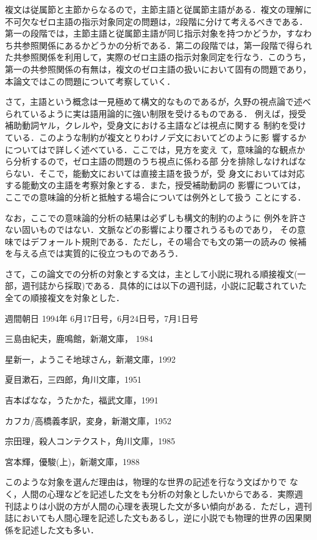 複文は従属節と主節からなるので，主節主語と従属節主語がある．複文の理解に
不可欠なゼロ主語の指示対象同定の問題は，2段階に分けて考えるべきである．
第一の段階では，主節主語と従属節主語が同じ指示対象を持つかどうか，すなわ
ち共参照関係にあるかどうかの分析である．第二の段階では，第一段階で得られ
た共参照関係を利用して，実際のゼロ主語の指示対象同定を行なう．このうち，
第一の共参照関係の有無は，複文のゼロ主語の扱いにおいて固有の問題であり，
本論文ではこの問題について考察していく．

さて，主語という概念は一見極めて構文的なものであるが，久野の視点論\cite
{久野78}で述べられているように実は語用論的に強い制限を受けるものである．
例えば，授受補助動詞ヤル，クレルや，受身文における主語などは視点に関する
制約を受けている．このような制約が複文とりわけノデ文においてどのように影
響するかについては\cite{中川動機95}で詳しく述べている．ここでは，見方を変え
て，意味論的な観点から分析するので，ゼロ主語の問題のうち視点に係わる部
分を排除しなければならない．そこで，能動文においては直接主語を扱うが，受
身文においては対応する能動文の主語を考察対象とする．また，授受補助動詞の
影響については，ここでの意味論的分析と抵触する場合については例外として扱う
ことにする．

なお，ここでの意味論的分析の結果は必ずしも構文的制約のように
例外を許さない固いものではない．文脈などの影響により覆されうるものであり，
その意味ではデフォールト規則である．ただし，その場合でも文の第一の読みの
候補を与える点では実質的に役立つものであろう．

さて，この論文での分析の対象とする文は，主として小説に現れる順接複文(一
部，週刊誌から採取)である．具体的には以下の週刊誌，小説に記載されていた
全ての順接複文を対象とした．

\noindent 週間朝日 1994年 6月17日号，6月24日号，7月1日号

\noindent 三島由紀夫，鹿鳴館，新潮文庫， 1984

\noindent 星新一，ようこそ地球さん，新潮文庫，1992

\noindent 夏目漱石，三四郎，角川文庫，1951

\noindent 吉本ばなな，うたかた，福武文庫，1991

\noindent カフカ/高橋義孝訳，変身，新潮文庫，1952

\noindent 宗田理，殺人コンテクスト，角川文庫，1985

\noindent 宮本輝，優駿(上)，新潮文庫，1988

\bigskip

このような対象を選んだ理由は，物理的な世界の記述を行なう文ばかりで
なく，人間の心理などを記述した文をも分析の対象としたいからである．実際週
刊誌よりは小説の方が人間の心理を表現した文が多い傾向がある．ただし，週刊
誌においても人間心理を記述した文もあるし，逆に小説でも物理的世界の因果関
係を記述した文も多い．

